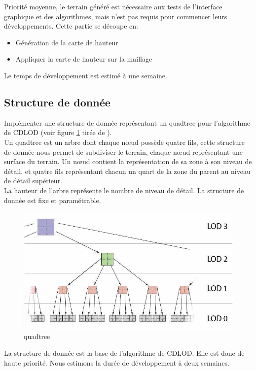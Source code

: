 \documentclass[12pt]{report}
\begin{document}
Priorité moyenne, le terrain généré est nécessaire aux tests de
l'interface graphique et des algorithmes, mais n'est pas requis pour
commencer leurs développements. Cette partie se découpe en:
\begin{itemize}
  \item Génération de la carte de hauteur
  \item Appliquer la carte de hauteur sur la maillage
\end{itemize}
Le temps de développement est estimé à une semaine.

\subsection{Structure de donnée}

Implémenter une structure de donnée représentant un quadtree pour
l'algorithme de CDLOD (voir figure \ref{fig:quadtree} tirée de 
\cite{CDLOD}).\\
Un quadtree est un arbre dont chaque nœud possède quatre fils, cette
structure de donnée nous permet de subdiviser le terrain, chaque nœud
représentant une surface du terrain. Un nœud contient la représentation
de sa zone à son niveau de détail, et quatre fils représentant chacun un
quart de la zone du parent au niveau de détail supérieur.\\
La hauteur de l'arbre représente le nombre de niveau de détail.
La structure de donnée est fixe et paramétrable.
\begin{center}
\begin{figure}[!h]
  \includegraphics[scale=0.5]{img/Quadtree.png}
  \caption{quadtree \cite{CDLOD}}
  \label{fig:quadtree}
\end{figure}
\end{center}

La structure de donnée est la base de l'algorithme de CDLOD. Elle est
donc de haute priorité. Nous estimons la durée de développement à deux
semaines.\\
\end{document}
